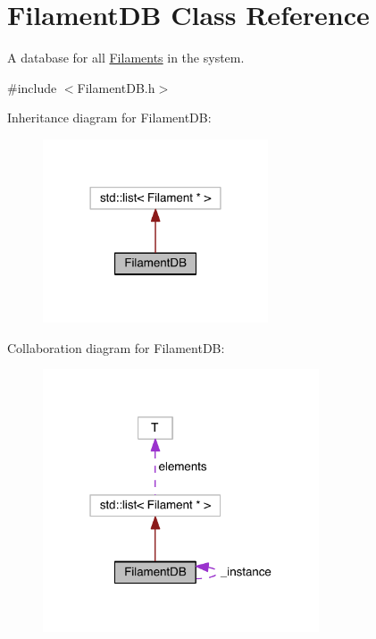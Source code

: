 \hypertarget{classFilamentDB}{\section{Filament\+D\+B Class Reference}
\label{classFilamentDB}
}


A database for all \hyperlink{classFilament}{Filaments} in the system.  




{\ttfamily \#include $<$Filament\+D\+B.\+h$>$}



Inheritance diagram for Filament\+D\+B\+:\nopagebreak
\begin{figure}[H]
\begin{center}
\leavevmode
\includegraphics[width=189pt]{classFilamentDB__inherit__graph}
\end{center}
\end{figure}


Collaboration diagram for Filament\+D\+B\+:\nopagebreak
\begin{figure}[H]
\begin{center}
\leavevmode
\includegraphics[width=232pt]{classFilamentDB__coll__graph}
\end{center}
\end{figure}
